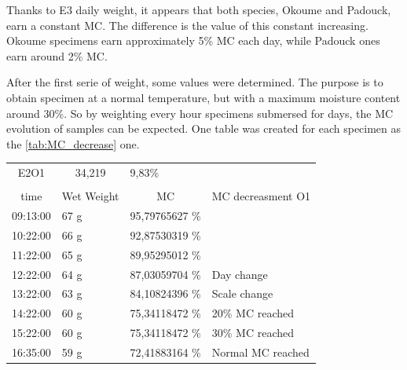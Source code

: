 Thanks to E3 daily weight, it appears that both species, Okoume and Padouck, earn a constant MC. The difference is the value of this constant increasing. Okoume specimens earn approximately 5\% MC each day, while Padouck ones earn around 2\% MC.

After the first serie of weight, some values were determined.
The purpose is to obtain specimen at a normal temperature, but with a maximum moisture content around 30\%. So by weighting every hour specimens submersed for days, the MC evolution of samples can be expected. One table was created for each specimen as the \ref{tab:MC_decrease} one.

\begin{table}[]
	\centering
	\begin{tabular}{llll}
		\cline{1-2}
		\multicolumn{1}{c}{\cellcolor[HTML]{F8CBAD}E2O1} & \multicolumn{1}{c}{\cellcolor[HTML]{F8CBAD}34,219} & 9,83\% &  \\ \cline{1-2}
		&  &  &  \\ 
		\multicolumn{1}{c}{time} & \multicolumn{1}{c}{Wet Weight} & \multicolumn{1}{c}{MC} & \multicolumn{1}{c}{MC decreasment O1} \\ 
		\multicolumn{1}{l}{\cellcolor[HTML]{A5A5A5}09:13:00} & \multicolumn{1}{l}{67 g} & \multicolumn{1}{l}{95,79765627   \%} &  \\ \cline{1-3}
		\multicolumn{1}{l}{10:22:00} & \multicolumn{1}{l}{66 g} & \multicolumn{1}{l}{92,87530319   \%} &  \\ \cline{1-3}
		\multicolumn{1}{l}{11:22:00} & \multicolumn{1}{l}{65 g} & \multicolumn{1}{l}{89,95295012   \%} &  \\ 
		\multicolumn{1}{l}{12:22:00} & \multicolumn{1}{l}{64 g} & \multicolumn{1}{l}{87,03059704   \%} & \multicolumn{1}{l}{\cellcolor[HTML]{A5A5A5}Day change} \\ 
		\multicolumn{1}{l}{13:22:00} & \multicolumn{1}{l}{63 g} & \multicolumn{1}{l}{84,10824396   \%} & \multicolumn{1}{l}{\cellcolor[HTML]{9BC2E6}Scale change} \\ 
		\multicolumn{1}{l}{14:22:00} & \multicolumn{1}{l}{60 g} & \multicolumn{1}{l}{75,34118472   \%} & \multicolumn{1}{l}{\cellcolor[HTML]{00B0F0}20\% MC reached} \\ 
		\multicolumn{1}{l}{15:22:00} & \multicolumn{1}{l}{60 g} & \multicolumn{1}{l}{75,34118472   \%} & \multicolumn{1}{l}{\cellcolor[HTML]{0070C0}30\% MC reached} \\ 
		\multicolumn{1}{l}{16:35:00} & \multicolumn{1}{l}{59 g} & \multicolumn{1}{l}{72,41883164   \%} & \multicolumn{1}{l}{\cellcolor[HTML]{FFC000}Normal MC reached} \\ 

\end{tabular}
\end{table}
